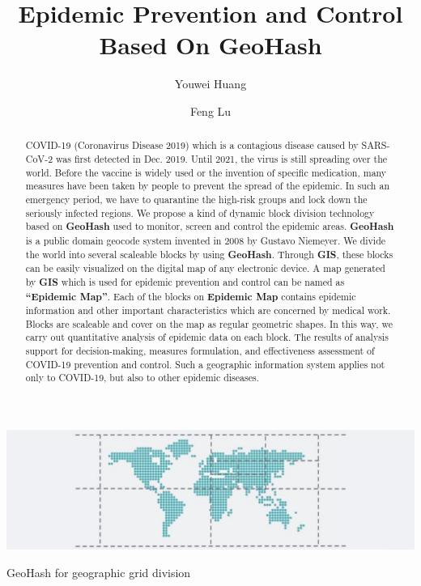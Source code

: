 \documentclass[sigplan,screen]{acmart}
\begin{document}
\title{Epidemic Prevention and Control Based On GeoHash}

\author{Youwei Huang}

\author{Feng Lu}

\begin{teaserfigure}
	\centering\includegraphics[width=\linewidth]{logo.png}
	\caption{GeoHash for geographic grid division}
\end{teaserfigure}

\begin{abstract}
	COVID-19 (Coronavirus Disease 2019) which is a contagious disease caused by SARS-CoV-2\cite{hu2020characteristics} was first detected in Dec. 2019.
	Until 2021, the virus is still spreading over the world.
	Before the vaccine is widely used or the invention of specific medication, many measures have been taken by people to prevent the spread of the epidemic.
	In such an emergency period, we have to quarantine the high-risk groups and lock down the seriously infected regions.
	We propose a kind of dynamic block division technology based on \textbf{GeoHash} used to monitor, screen and control the epidemic areas.
	\textbf{GeoHash} is a public domain geocode system invented in 2008 by Gustavo Niemeyer\cite{niemeyer2008geohash}.
	We divide the world into several scaleable blocks by using \textbf{GeoHash}.
	Through \textbf{GIS}, these blocks can be easily visualized on the digital map of any electronic device.
	A map generated by \textbf{GIS} which is used for epidemic prevention and control can be named as \textbf{``Epidemic Map''}.
	Each of the blocks on \textbf{Epidemic Map} contains epidemic information and other important characteristics which are concerned by medical work.
	Blocks are scaleable and cover on the map as regular geometric shapes.
	In this way, we carry out quantitative analysis of epidemic data on each block.
	The results of analysis support for decision-making, measures formulation, and effectiveness assessment of COVID-19 prevention and control.
	Such a geographic information system applies not only to COVID-19, but also to other epidemic diseases.
\end{abstract}
\end{document}
